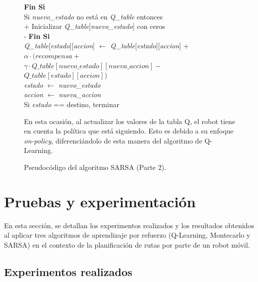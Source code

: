 \documentclass[conference,a4paper]{IEEEtran}
\begin{document}
\begin{figure}
  \begin{minipage}{\linewidth}
  \begin{pseudo}
  \textbf{Fin Si} \\
  Si \textit{nuevo\_estado} \textnormal{no está en} \textit{Q\_table} entonces \\+
    Inicializar \textit{Q\_table}[\textit{nuevo\_estado}] con ceros \\-
  \textbf{Fin Si} \\
  \textit{Q\_table}[\textit{estado}][\textit{accion}] $\leftarrow$ \textit{Q\_table}[\textit{estado}][\textit{accion}] + \\
  \> $\alpha \cdot (\textit{recompensa} + $ \\
  \> $\gamma \cdot \textit{Q\_table}[\textit{nuevo\_estado}][\textit{nueva\_accion}] -$ \\
  \> $\textit{Q\_table}[\textit{estado}][\textit{accion}])$ \\
  \> \textit{estado} $\leftarrow$ \textit{nuevo\_estado} \\
  \> \textit{accion} $\leftarrow$ \textit{nueva\_accion} \\
  \> Si \textit{estado} == destino, terminar \\
  \end{pseudo}
  \end{minipage}
  \caption{Pseudocódigo del algoritmo SARSA (Parte 2).}
  \label{fig:sarsa2}
  \vspace{0.5cm} 
  En esta ocasión, al actualizar los valores de la tabla Q, el robot tiene en cuenta la política que está siguiendo. Esto es debido a su enfoque \textit{on-policy}, diferenciándolo de esta manera del algoritmo de Q-Learning.\newline
\end{figure}



\section{Pruebas y experimentación}
En esta sección, se detallan los experimentos realizados y los resultados obtenidos al aplicar tres algoritmos de aprendizaje por refuerzo (Q-Learning, Montecarlo y SARSA) 
en el contexto de la planificación de rutas por parte de un robot móvil.

\subsection{Experimentos realizados}
\end{document}
